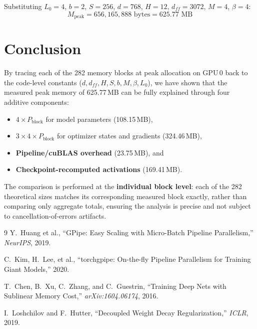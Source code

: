 \documentclass[11pt,a4paper]{article}
\begin{document}
\noindent Substituting $L_0=4$, $b=2$, $S=256$, $d=768$, $H=12$, $d_{ff}=3072$, $M=4$, $\beta=4$:
\begin{equation}
  M_{\text{peak}} = 656{,}165{,}888 \text{~bytes} = 625.77 \text{~MB}
\end{equation}

\section{Conclusion}
\label{sec:conclusion}

By tracing each of the 282 memory blocks at peak allocation on GPU\,0 back to the code-level constants ($d, d_{ff}, H, S, b, M, \beta, L_0$), we have shown that the measured peak memory of 625.77\,MB can be fully explained through four additive components:
\begin{itemize}
  \item \textbf{$4 \times P_{\text{block}}$} for model parameters (108.15\,MB),
  \item \textbf{$3 \times 4 \times P_{\text{block}}$} for optimizer states and gradients (324.46\,MB),
  \item \textbf{Pipeline/cuBLAS overhead} (23.75\,MB), and
  \item \textbf{Checkpoint-recomputed activations} (169.41\,MB).
\end{itemize}

The comparison is performed at the \textbf{individual block level}: each of the 282 theoretical sizes matches its corresponding measured block exactly, rather than comparing only aggregate totals, ensuring the analysis is precise and not subject to cancellation-of-errors artifacts.

\begin{thebibliography}{9}
Y.~Huang et al.,
``GPipe: Easy Scaling with Micro-Batch Pipeline Parallelism,''
\emph{NeurIPS}, 2019.

C.~Kim, H.~Lee, et al.,
``torchgpipe: On-the-fly Pipeline Parallelism for Training Giant Models,''
2020.

T.~Chen, B.~Xu, C.~Zhang, and C.~Guestrin,
``Training Deep Nets with Sublinear Memory Cost,''
\emph{arXiv:1604.06174}, 2016.

I.~Loshchilov and F.~Hutter,
``Decoupled Weight Decay Regularization,''
\emph{ICLR}, 2019.
\end{thebibliography}
\end{document}
